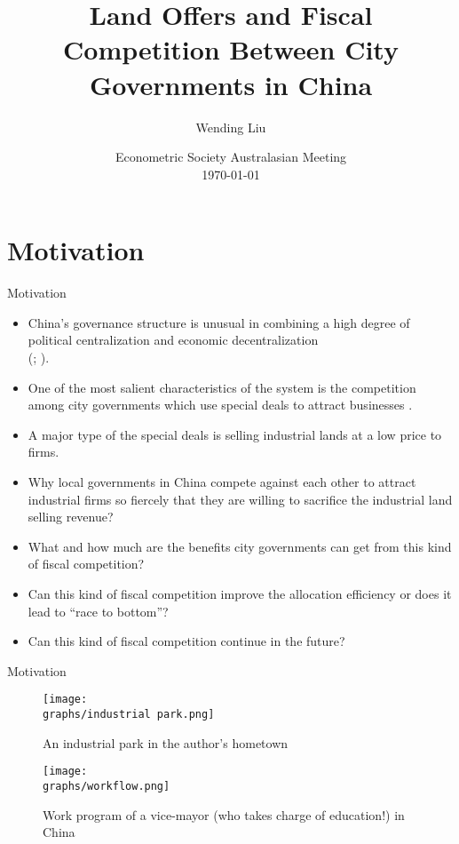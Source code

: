 \documentclass[xcolor={dvipsnames}]{beamer}
\title{\Large{Land Offers and Fiscal Competition Between City Governments in China}}
\author{Wending Liu}
\institute{ANU Research School of Economics}
\date{Econometric Society Australasian Meeting\\\monthyeardate\today}
\theoremstyle{plain}
\newcommand{\graphs}{../../Graphs}
\begin{document}
\maketitle


\section{Motivation}
\begin{frame}{Motivation}
    \begin{itemize}
        \item China's governance structure is unusual in combining a high degree of
              political centralization and economic decentralization \\
              (; ).
        \item One of the most salient characteristics of the system is
              the competition among city governments which use special deals to attract businesses
              \cite{bai2020special}.
        \item A major type of the special deals is
              selling industrial lands at a low price to firms.
              \cite{su2017china}
        \item Why local governments in China compete against each other
              to attract industrial firms so fiercely that they are willing to sacrifice the industrial
              land selling revenue?
        \item What and how much are the benefits city governments
              can get from this kind of fiscal competition?
        \item Can this kind of fiscal competition improve the allocation efficiency or
              does it lead to ``race to bottom''?
        \item Can this kind of fiscal competition continue in the future?
    \end{itemize}
\end{frame}

\begin{frame}{Motivation}
    \begin{figure}[htbp]
        \centering
        \begin{minipage}[t]{0.48\textwidth}
            \centering
            \texttt{[image: \\graphs/industrial park.png]}
            \caption*{An industrial park in the author's hometown}
            \label{industrial park}
        \end{minipage}
        \begin{minipage}[t]{0.48\textwidth}
            \centering
            \texttt{[image: \\graphs/workflow.png]}
            \caption*{Work program of a vice-mayor (who takes charge of education!) in China \cite{bai2020special}}
            \label{workflow}
        \end{minipage}
    \end{figure}
\end{frame}
\end{document}
